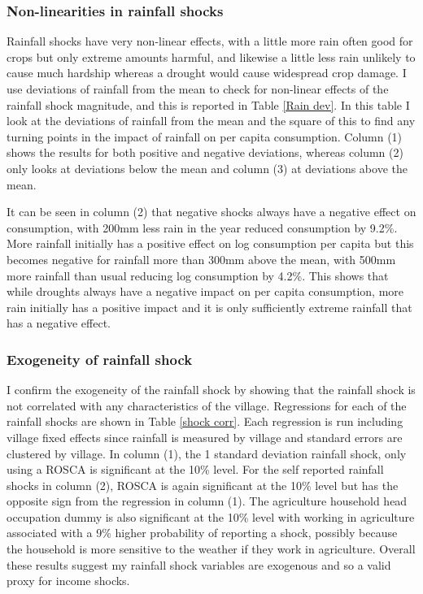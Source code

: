 

\subsubsection{Non-linearities in rainfall shocks}
Rainfall shocks have very non-linear effects, with a little more rain often good for crops but only extreme amounts harmful, and likewise a little less rain unlikely to cause much hardship whereas a drought would cause widespread crop damage. I use deviations of rainfall from the mean to check for non-linear effects of the rainfall shock magnitude, and this is reported in Table \ref{Rain dev}. In this table I look at the deviations of rainfall from the mean and the square of this to find any turning points in the impact of rainfall on per capita consumption. Column (1) shows the results for both positive and negative deviations, whereas column (2) only looks at deviations below the mean and column (3) at deviations above the mean. 

It can be seen in column (2) that negative shocks always have a negative effect on consumption, with 200mm less rain in the year reduced consumption by 9.2\%. More rainfall initially has a positive effect on log consumption per capita but this becomes negative for rainfall more than 300mm above the mean, with 500mm more rainfall than usual reducing log consumption by 4.2\%. This shows that while droughts always have a negative impact on per capita consumption, more rain initially has a positive impact and it is only sufficiently extreme rainfall that has a negative effect. 


\subsubsection{Exogeneity of rainfall shock}
I confirm the exogeneity of the rainfall shock by showing that the rainfall shock is not correlated with any characteristics of the village. Regressions for each of the rainfall shocks are shown in Table \ref{shock corr}. Each regression is run including village fixed effects since rainfall is measured by village and standard errors are clustered by village. In column (1), the 1 standard deviation rainfall shock, only using a ROSCA is significant at the 10\% level. For the self reported rainfall shocks in column (2), ROSCA is again significant at the 10\% level but has the opposite sign from the regression in column (1). The agriculture household head occupation dummy is also significant at the 10\% level with working in agriculture associated with a 9\% higher probability of reporting a shock, possibly because the household is more sensitive to the weather if they work in agriculture. Overall these results suggest my rainfall shock variables are exogenous and so a valid proxy for income shocks. 

